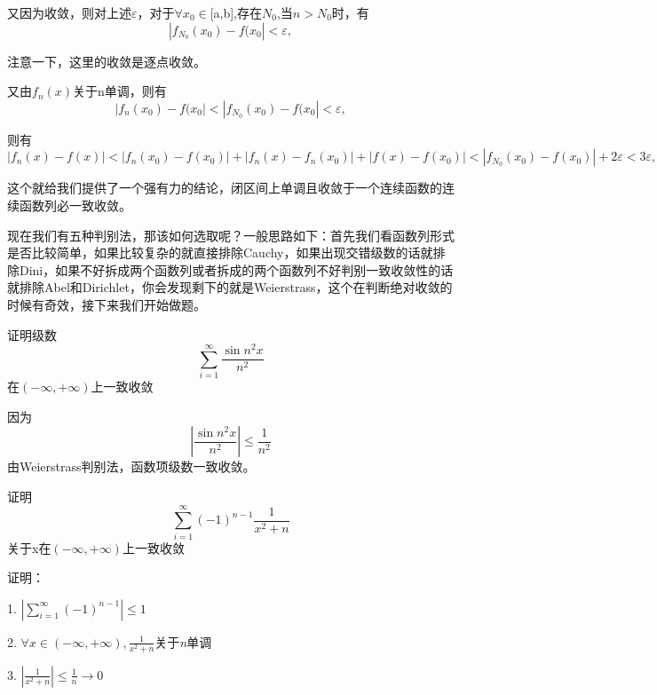 \documentclass[lang=cn,10pt]{elegantbook}
\begin{document}
又因为收敛，则对上述$\varepsilon$，对于$\forall x_{0}\in$[a,b],存在$N_{0}$,当$n>N_{0}$时，有
\begin{equation*}
	|f_{N_{0}}(x_{0})-f(x_{0}|	<\varepsilon,
\end{equation*}

注意一下，这里的收敛是逐点收敛。

又由$f_{n}(x)$关于n单调，则有
\begin{equation*}
	|f_{n}(x_{0})-f(x_{0}|<|f_{N_{0}}(x_{0})-f(x_{0}|	<\varepsilon,
\end{equation*}

则有
\begin{equation*}
	|f_{n}(x)-f(x)|<|f_{n}(x_{0})-f(x_{0})|+	|f_{n}(x)-f_{n}(x_{0})|+|f(x)-f(x_{0})|	<|f_{N_{0}}(x_{0})-f(x_{0})|+2\varepsilon<3\varepsilon,
\end{equation*}

这个就给我们提供了一个强有力的结论，闭区间上单调且收敛于一个连续函数的连续函数列必一致收敛。

现在我们有五种判别法，那该如何选取呢？一般思路如下：首先我们看函数列形式是否比较简单，如果比较复杂的就直接排除Cauchy，如果出现交错级数的话就排除Dini，如果不好拆成两个函数列或者拆成的两个函数列不好判别一致收敛性的话就排除Abel和Dirichlet，你会发现剩下的就是Weierstrass，这个在判断绝对收敛的时候有奇效，接下来我们开始做题。

\begin{example}
	证明级数
	\begin{equation*}
		\sum_{i=1}^{\infty } \frac{\sin n^{2}x  }{n^{2}} 
	\end{equation*}
    在$(-\infty,+\infty)$上一致收敛
\end{example}
因为\begin{equation*}
	|\frac{\sin n^{2}x  }{n^{2}}|\le \frac{1}{n^{2}}
\end{equation*}
由Weierstrass判别法，函数项级数一致收敛。

\begin{example}
	证明
	\begin{equation*}
		\sum_{i=1}^{\infty } (-1)^{n-1}\frac{1  }{x^{2}+n} 
	\end{equation*}
	关于x在$(-\infty,+\infty)$上一致收敛
\end{example}

证明：

1. $|\sum_{i=1}^{\infty } (-1)^{n-1}| \le 1$

2. $\forall x \in (-\infty,+\infty),\frac{1  }{x^{2}+n}$关于\textit{n}单调

3. $|\frac{1  }{x^{2}+n}| \le \frac{1}{n}\longrightarrow 0$
\end{document}
